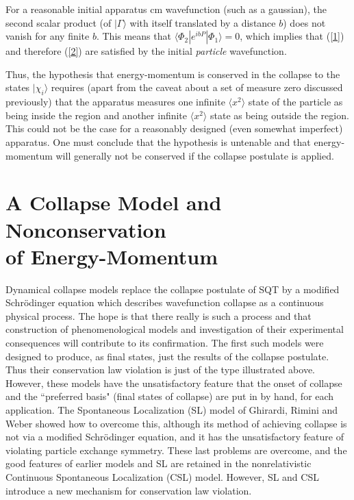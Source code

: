 \documentclass{article}
\begin{document}
\noindent For a reasonable initial apparatus cm wavefunction (such as a gaussian), the second scalar product  
(of $|\Gamma\rangle$ with itself translated by a distance $b$) does not vanish for any finite $b$.  This 
means that $\langle\Phi_{2}| e^{ibP}|\Phi_{1}\rangle = 0$, which implies that (\ref{1}) and therefore 
(\ref{2}) are satisfied by the initial {\it particle} wavefunction. 

	Thus, the hypothesis that energy-momentum is conserved in 
the collapse to the states $|\chi_{i}\rangle$ requires (apart from the caveat about a set of measure zero 
discussed previously) that the apparatus 
measures one infinite $\langle x^{2}\rangle$ state of the particle as being inside the 
region and another infinite $\langle x^{2}\rangle$ state as being outside the region. This could not 
be the case for a reasonably designed (even somewhat imperfect) apparatus. 
One must conclude that the hypothesis is untenable and 
that energy-momentum will generally not be conserved if the collapse postulate is applied. 


\section{A Collapse Model and Nonconservation\\ of Energy-Momentum}\label{Intro}


\hspace{\parindent}Dynamical collapse models replace the collapse postulate of SQT by a modified 
Schr\"odinger equation which describes wavefunction collapse as a 
continuous physical process. The hope is that there really is such a process  
and that construction of phenomenological models and 
investigation of their experimental consequences will contribute 
to its confirmation. The first such models \cite{BohmBub,Pearle76-86} were 
designed to produce, as final states, just the results of the collapse postulate.  
Thus their conservation law violation is just of the type illustrated above.  
However, these models have the unsatisfactory feature that the onset of collapse 
and the ``preferred basis" (final states of collapse) are put in 
by hand, for each application\cite{PearlePerugia, Pearle89}. 
The Spontaneous Localization 
(SL) model\cite{GRW,GRReview} of Ghirardi, Rimini and Weber 
showed how to overcome this, although its 
method of achieving collapse is not via a modified Schr\"odinger equation, 
and it has the unsatisfactory feature of violating particle 
exchange symmetry. These last problems are overcome, and the good features of 
earlier models and SL are retained in the nonrelativistic 
Continuous Spontaneous Localization (CSL) 
model\cite{Pearle89,GPR,GPReview,PearleNaples}.  However, SL and CSL introduce 
a new mechanism for conservation law violation.  
\end{document}
